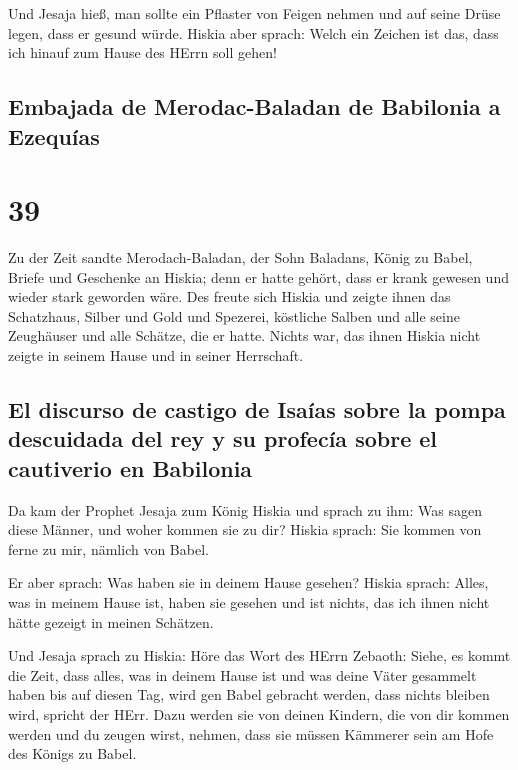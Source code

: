  Und Jesaja hieß, man sollte ein Pflaster von Feigen
nehmen und auf seine Drüse legen, dass er gesund würde. 
Hiskia aber sprach: Welch ein Zeichen ist das, dass ich hinauf zum Hause
des HErrn soll gehen!

\hypertarget{embajada-de-merodac-baladan-de-babilonia-a-ezequuxedas}{%
\subsection{Embajada de Merodac-Baladan de Babilonia a
Ezequías}\label{embajada-de-merodac-baladan-de-babilonia-a-ezequuxedas}}

\hypertarget{section-38}{%
\section{39}\label{section-38}}

 Zu der Zeit sandte Merodach-Baladan, der Sohn Baladans,
König zu Babel, Briefe und Geschenke an Hiskia; denn er hatte gehört,
dass er krank gewesen und wieder stark geworden wäre.  Des
freute sich Hiskia und zeigte ihnen das Schatzhaus, Silber und Gold und
Spezerei, köstliche Salben und alle seine Zeughäuser und alle Schätze,
die er hatte. Nichts war, das ihnen Hiskia nicht zeigte in seinem Hause
und in seiner Herrschaft.

\hypertarget{el-discurso-de-castigo-de-isauxedas-sobre-la-pompa-descuidada-del-rey-y-su-profecuxeda-sobre-el-cautiverio-en-babilonia}{%
\subsection{El discurso de castigo de Isaías sobre la pompa descuidada
del rey y su profecía sobre el cautiverio en
Babilonia}\label{el-discurso-de-castigo-de-isauxedas-sobre-la-pompa-descuidada-del-rey-y-su-profecuxeda-sobre-el-cautiverio-en-babilonia}}

 Da kam der Prophet Jesaja zum König Hiskia und sprach zu
ihm: Was sagen diese Männer, und woher kommen sie zu dir? Hiskia sprach:
Sie kommen von ferne zu mir, nämlich von Babel.

 Er aber sprach: Was haben sie in deinem Hause gesehen?
Hiskia sprach: Alles, was in meinem Hause ist, haben sie gesehen und ist
nichts, das ich ihnen nicht hätte gezeigt in meinen Schätzen.

 Und Jesaja sprach zu Hiskia: Höre das Wort des HErrn
Zebaoth:  Siehe, es kommt die Zeit, dass alles, was in
deinem Hause ist und was deine Väter gesammelt haben bis auf diesen Tag,
wird gen Babel gebracht werden, dass nichts bleiben wird, spricht der
HErr.  Dazu werden sie von deinen Kindern, die von dir
kommen werden und du zeugen wirst, nehmen, dass sie müssen Kämmerer sein
am Hofe des Königs zu Babel.

